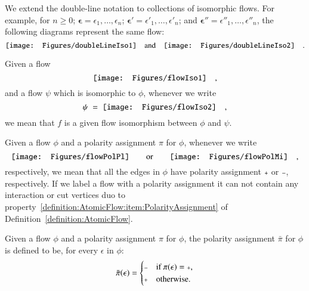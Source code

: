 \begin{notation}
We extend the double-line notation to collections of isomorphic flows. For example, for $n\ge0$; $\boldsymbol{\epsilon}=\epsilon_1,\dots,\epsilon_n$; $\boldsymbol{\epsilon'}=\epsilon'_1,\dots,\epsilon'_n$; and $\boldsymbol{\epsilon''}=\epsilon''_1,\dots,\epsilon''_n$, the following diagrams represent the same flow:
\[
\vcenter{\hbox{\texttt{[image: Figures/doubleLineIso1]}}}
\quad\mbox{and}\quad
\vcenter{\hbox{\texttt{[image: Figures/doubleLineIso2]}}}
\quad.
\]
\end{notation}


\begin{notation}\label{notation:LabelsIsomorphicFlows}
Given a flow
\[
\vcenter{\hbox{\texttt{[image: Figures/flowIso1]}}}
\quad,
\]
and a flow $\psi$ which is isomorphic to $\phi$, whenever we write
\[
\psi\;=\;
\vcenter{\hbox{\texttt{[image: Figures/flowIso2]}}}
\quad,
\]
we mean that $f$ is a given flow isomorphism between $\phi$ and $\psi$.
\end{notation}


\begin{notation}
Given a flow $\phi$ and a polarity assignment $\pi$ for $\phi$, whenever we write
\[
\vcenter{\hbox{\texttt{[image: Figures/flowPolPl]}}}
\qquad\mbox{or}\qquad
\vcenter{\hbox{\texttt{[image: Figures/flowPolMi]}}}
\quad,
\]
respectively, we mean that all the edges in $\phi$ have polarity assignment $\ppl$ or $\pmi$, respectively. If we label a flow with a polarity assignment it can not contain any interaction or cut vertices duo to property~\ref{definition:AtomicFlow:item:PolarityAssignment} of Definition~\vref{definition:AtomicFlow}.
\end{notation}

\begin{definition}
Given a flow $\phi$ and a polarity assignment $\pi$ for $\phi$, the polarity assignment $\bar\pi$ for $\phi$ is defined to be, for every $\epsilon$ in $\phi$:
\[
\bar\pi(\epsilon)=
\begin{cases}
\pmi & \mbox{if $\pi(\epsilon)=\ppl$,}
\\
\ppl & \mbox{otherwise.}
\end{cases}
\]
\end{definition}

